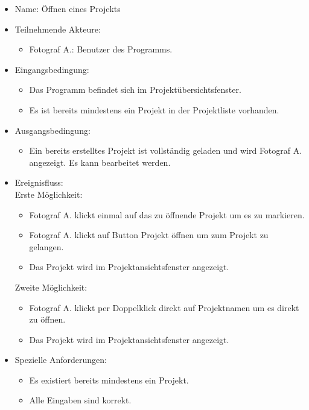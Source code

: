 		\begin{itemize}
			\item Name: Öffnen eines Projekts
			\item Teilnehmende Akteure:
			\begin{itemize}
				\item	Fotograf A.: Benutzer des Programms.		
			\end{itemize}
			\item Eingangsbedingung:
			\begin{itemize}
				\item	Das Programm befindet sich im Projektübersichtsfenster.
				\item Es ist bereits mindestens ein Projekt in der Projektliste vorhanden.
			\end{itemize}
			\item Ausgangsbedingung:
			\begin{itemize}
				\item	Ein bereits erstelltes Projekt ist vollständig geladen und wird Fotograf A. angezeigt. Es kann bearbeitet werden.		
			\end{itemize}
			\item Ereignisfluss:\\Erste Möglichkeit:
			\begin{itemize}
				\item Fotograf A. klickt einmal auf das zu öffnende Projekt um es zu markieren.
				\item Fotograf A. klickt auf Button Projekt öffnen um zum Projekt zu gelangen.
				\item Das Projekt wird im Projektansichtsfenster angezeigt.
			\end{itemize}
			Zweite Möglichkeit:
			\begin{itemize}
				\item Fotograf A. klickt per Doppelklick direkt auf Projektnamen um es direkt zu öffnen.
				\item Das Projekt wird im Projektansichtsfenster angezeigt.					
			\end{itemize}
			\item Spezielle Anforderungen:
			\begin{itemize}
				\item	Es existiert bereits mindestens ein Projekt.
				\item Alle Eingaben sind korrekt.
			\end{itemize}			
		\end{itemize}
		
